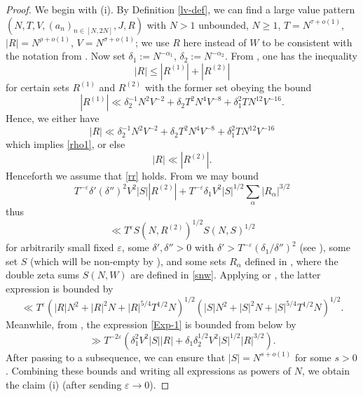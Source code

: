 \documentclass[a4paper, 10pt]{amsart}
\newcommand{\eps}{\varepsilon}
\begin{document}
    \begin{proof}  We begin with (i). By Definition \ref{lv-def}, we can find a large value pattern $(N,T,V,(a_n)_{n \in [N,2N]},J,R)$ with $N>1$ unbounded, $N \geq 1$, $T = N^{\tau+o(1)}$, $|R| = N^{\rho+o(1)}$, $V = N^{\sigma+o(1)}$; we use $R$ here instead of $W$ to be consistent with the notation from \cite{bourgain_large_2000}.  Now set $\delta_1 := N^{-\alpha_1}$, $\delta_2 := N^{-\alpha_2}$.  From \cite[(4.41), (4.42)]{bourgain_large_2000}, one has the inequality
        $$ |R| \leq |R^{(1)}| + |R^{(2)}|$$
        for certain sets $R^{(1)}$ and $R^{(2)}$ with the former set obeying the bound
    $$ |R^{(1)}| \ll \delta_2^{-1} N^2 V^{-2} + \delta_2 T^2 N^4 V^{-8} + \delta_1^2 T N^{12} V^{-16}.$$
    Hence, we either have
    $$ |R| \ll \delta_2^{-1} N^2 V^{-2} + \delta_2 T^2 N^4 V^{-8} + \delta_1^2 T N^{12} V^{-16}$$
    which implies \eqref{rho1}, or else
    \begin{equation}\label{rr}
        |R| \ll |R^{(2)}|.
    \end{equation}
    Henceforth we assume that \eqref{rr} holds. From \cite[(4.53), (4.54)]{bourgain_large_2000} we may  bound
    \begin{equation}\label{Exp-1}
         T^{-\eps} \delta' (\delta'')^2 V^2 |S| |R^{(2)}| + T^{-\eps} \delta_1 V^2 |S|^{1/2} \sum_\alpha |R_\alpha|^{3/2}
    \end{equation}
  thus
    \begin{equation*}\label{Exp-2}
        \ll T^\eps S(N,R^{(2)})^{1/2} S(N,S)^{1/2}
    \end{equation*}
    for arbitrarily small fixed $\eps$, some $\delta',\delta''>0$ with $\delta' > T^{-\eps} (\delta_1/\delta'')^2$ (see \cite[(4.37)]{bourgain_large_2000}), some set $S$ (which will be non-empty by \cite[(4.47)]{bourgain_large_2000}), and some sets $R_\alpha$ defined in \cite[(4.39)]{bourgain_large_2000}, where the double zeta sums $S(N,W)$ are defined in \eqref{snw}.  Applying \cite[Theorem 1]{heathbrown_large_1979} or \cite[Lemma 11.5]{ivic}, the latter expression is bounded by
    $$ \ll T^\eps (|R|N^2 + |R|^2 N + |R|^{5/4} T^{1/2} N)^{1/2} (|S| N^2 + |S|^2 N + |S|^{5/4} T^{1/2} N)^{1/2}.$$
    Meanwhile, from \cite[(4.57)]{bourgain_large_2000}, the expression \eqref{Exp-1} is bounded from below by
    $$ \gg T^{-2\eps} (\delta_1^2 V^2 |S| |R| + \delta_1 \delta_2^{1/2} V^2 |S|^{1/2} |R|^{3/2}).$$
    After passing to a subsequence, we can ensure that $|S| = N^{s+o(1)}$ for some $s > 0$.
    Combining these bounds and writing all expressions as powers of $N$, we obtain the claim (i) (after sending $\eps \to 0$).


\end{proof}
\end{document}
